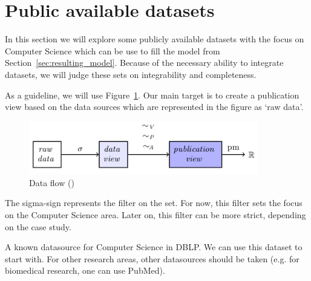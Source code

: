 \documentclass{ou-report}
\begin{document}

\section{Public available datasets}
In this section we will explore some publicly available datasets with the focus 
on Computer Science which can be use to fill the model from 
Section~\ref{sec:resulting_model}. Because of the necessary ability to integrate 
datasets, we will judge these sets on integrability and completeness.

As a guideline, we will use Figure~\ref{fig:dataflow_jm2017_2}. Our main target
is to create a publication view based on the data sources which are represented
in the figure as `raw data'.
\begin{figure}[H]
    \centering
    \includegraphics[width=10cm]{images/data_to_publication_metrics_jm2017.png}
    \caption{Data flow (\cite{JM2017})}
    \label{fig:dataflow_jm2017_2}
\end{figure}

The sigma-sign represents the filter on the set. For now, this filter sets the 
focus on the Computer Science area. Later on, this filter can be more 
strict, depending on the case study.

A known datasource for Computer Science in DBLP. We can use this dataset to start
with. For other research areas, other datasources should be taken (e.g. for 
biomedical research, one can use PubMed).
\end{document}
